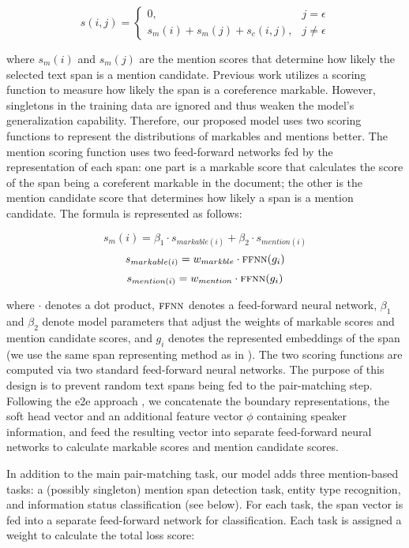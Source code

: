 \documentclass[11pt]{article}
\begin{document}
\vspace{-3mm}
\[s(i, j) = 
\begin{cases}
0, & j = \epsilon\\
s_m(i) + s_m(j) + s_c(i, j), & j \neq \epsilon
\end{cases}\]

\noindent where $s_m(i)$ and $s_m(j)$ are the mention scores that determine how likely the selected text span is a mention candidate. 
Previous work utilizes a scoring function to measure how likely the span is a coreference markable. However, singletons in the training data are ignored and thus weaken the model's generalization capability. Therefore, our proposed model uses two scoring functions to represent the distributions of markables and mentions better. The mention scoring function uses two feed-forward networks fed by the representation of each span: one part is a markable score that calculates the score of the span being a coreferent markable in the document; the other is the mention candidate score that determines how likely a span is a mention candidate. The formula is represented as follows:

\vspace{-3mm}
\[s_m(i) = \beta_1 \cdot s_{markable(i)} + \beta_2 \cdot s_{mention(i)}\]
\[s_{markable(i)} = w_{markble} \cdot \textsc{ffnn}(g_i) \]
\[s_{mention(i)} = w_{mention} \cdot \textsc{ffnn}(g_i) \]

\noindent where $\cdot$ denotes a dot product, $\textsc{ffnn}$ denotes a feed-forward neural network, $\beta_1$ and $\beta_2$ denote model parameters that adjust the weights of markable scores and mention candidate scores, and $g_i$ denotes the represented embeddings of the span (we use the same span representing method as in \citet{lee-etal-2017-end}). The two scoring functions are computed via two standard feed-forward neural networks. The purpose of this design is to prevent random text spans being fed to the pair-matching step. Following the e2e approach \citep{lee-etal-2017-end, lee-etal-2018-higher, joshi-etal-2020-spanbert}, we concatenate the boundary representations, the soft head vector and an additional feature vector $\phi$ containing speaker information, and feed the resulting vector into separate feed-forward neural networks to calculate markable scores and mention candidate scores.

In addition to the main pair-matching task, our model adds three mention-based tasks: a (possibly singleton) mention span detection task, entity type recognition, and information status classification (see below). For each task, the span vector is fed into a separate feed-forward network for classification. Each task is assigned a weight to calculate the total loss score:
\end{document}
